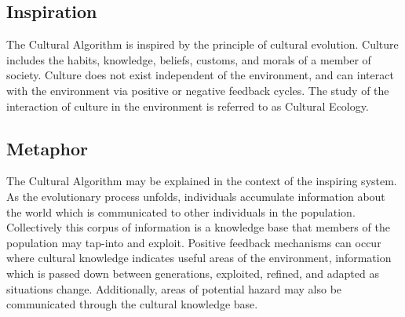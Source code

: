 \subsection{Inspiration}
The Cultural Algorithm is inspired by the principle of cultural evolution.
Culture includes the habits, knowledge, beliefs, customs, and morals of a member of society. Culture does not exist independent of the environment, and can interact with the environment via positive or negative feedback cycles. The study of the interaction of culture in the environment is referred to as Cultural Ecology.

\subsection{Metaphor}
The Cultural Algorithm may be explained in the context of the inspiring system. As the evolutionary process unfolds, individuals accumulate information about the world which is communicated to other individuals in the population. Collectively this corpus of information is a knowledge base that members of the population may tap-into and exploit. Positive feedback mechanisms can occur where cultural knowledge indicates useful areas of the environment, information which is passed down between generations, exploited, refined, and adapted as situations change. Additionally, areas of potential hazard may also be communicated through the cultural knowledge base.

